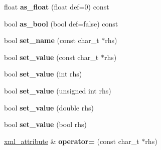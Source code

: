 \begin{DoxyCompactItemize}
\item 
\hypertarget{classpugi_1_1xml__attribute_a23f960683dba03f32ed4da19a10c769d}{}float {\bfseries as\+\_\+float} (float def=0) const \label{classpugi_1_1xml__attribute_a23f960683dba03f32ed4da19a10c769d}

\item 
\hypertarget{classpugi_1_1xml__attribute_a715646ddcfcd9f327934f9083f949796}{}bool {\bfseries as\+\_\+bool} (bool def=false) const \label{classpugi_1_1xml__attribute_a715646ddcfcd9f327934f9083f949796}

\item 
\hypertarget{classpugi_1_1xml__attribute_ae8ffb5ef48338f27015337a6f57b6595}{}bool {\bfseries set\+\_\+name} (const char\+\_\+t $\ast$rhs)\label{classpugi_1_1xml__attribute_ae8ffb5ef48338f27015337a6f57b6595}

\item 
\hypertarget{classpugi_1_1xml__attribute_af2ca1f0d13ee8f661bc17524bedc13d7}{}bool {\bfseries set\+\_\+value} (const char\+\_\+t $\ast$rhs)\label{classpugi_1_1xml__attribute_af2ca1f0d13ee8f661bc17524bedc13d7}

\item 
\hypertarget{classpugi_1_1xml__attribute_aa9fcffccebda6ae6169e4d17265bd39a}{}bool {\bfseries set\+\_\+value} (int rhs)\label{classpugi_1_1xml__attribute_aa9fcffccebda6ae6169e4d17265bd39a}

\item 
\hypertarget{classpugi_1_1xml__attribute_abffdc566e5e2805c493f18f8424f5024}{}bool {\bfseries set\+\_\+value} (unsigned int rhs)\label{classpugi_1_1xml__attribute_abffdc566e5e2805c493f18f8424f5024}

\item 
\hypertarget{classpugi_1_1xml__attribute_a5e58f7565792ba3afd432325f824f1b3}{}bool {\bfseries set\+\_\+value} (double rhs)\label{classpugi_1_1xml__attribute_a5e58f7565792ba3afd432325f824f1b3}

\item 
\hypertarget{classpugi_1_1xml__attribute_a33ab85a706a18f88241081ab8b0f823f}{}bool {\bfseries set\+\_\+value} (bool rhs)\label{classpugi_1_1xml__attribute_a33ab85a706a18f88241081ab8b0f823f}

\item 
\hypertarget{classpugi_1_1xml__attribute_a957f7613ba25623fa3bdf1c50346b869}{}\hyperlink{classpugi_1_1xml__attribute}{xml\+\_\+attribute} \& {\bfseries operator=} (const char\+\_\+t $\ast$rhs)\label{classpugi_1_1xml__attribute_a957f7613ba25623fa3bdf1c50346b869}


\end{DoxyCompactItemize}
